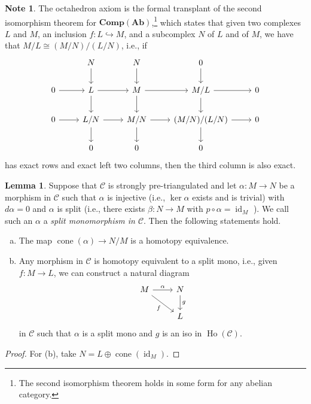 \documentclass[10pt,letterpaper,cm]{nupset}
\theoremstyle{definition}
\newtheorem{note}{Note}
\newtheorem{lemma}{Lemma}
\newcommand{\1}{\mathbf{1}}
\renewcommand{\c}{\mathscr{C}}
\newcommand{\0}{\vec 0}
\DeclareMathOperator{\id}{id}
\DeclareMathOperator{\cone}{cone}
\DeclareMathOperator{\ho}{Ho}
\begin{document}
\begin{note}
The octahedron axiom is the formal transplant of the second isomorphism theorem for $\mathbf{Comp}(\mathbf{Ab})$,\footnote{The second isomorphism theorem holds in some form for any abelian category.} which states that given two complexes $L$ and $M$, an inclusion $f : L \hookrightarrow M$, and a subcomplex $N$ of $L$ and of $M$, we have that $ M/L \cong (M/N)/(L/N)$, i.e., if
\[
\begin{tikzcd}
            & N \arrow[d]   & N \arrow[d]   & 0 \arrow[d]                     &   \\
0 \arrow[r] & L \arrow[d] \arrow[r]   & M \arrow[d] \arrow[r]   & M/L \arrow[d] \arrow[r]         & 0 \\
0 \arrow[r] & L/N \arrow[d] \arrow[r] & M/N \arrow[d] \arrow[r] & (M/N)/(L/N) \arrow[d] \arrow[r] & 0 \\
            & 0                       & 0                       & 0                               &  
\end{tikzcd}
\]
has exact rows and exact left two columns, then the third column is also exact. 
\end{note}

\begin{lemma}
Suppose that $\c$ is strongly pre-triangulated and let $\alpha : M \to N$ be a morphism in $\c$ such that $\alpha$ is injective (i.e., $\ker{\alpha}$ exists and is trivial) with $d{\alpha} =0$ and $\alpha$ is split (i.e.,  there exists $\beta : N \to M$ with $p \circ \alpha = \id_M$ ). We call such an $\alpha$ a \textit{split monomorphism in $\c$}. Then the following statements hold.
\begin{enumerate}[(a)]
\item The map $\cone(\alpha) \to N/M$ is a homotopy equivalence.
\item Any morphism in $\c$ is homotopy equivalent to a split mono, i.e., given $ f: M \to L$, we can construct a natural diagram 
\[
\begin{tikzcd}
M \arrow[r, "\alpha"] \arrow[rd, "f"'] & N \arrow[d, "g"] \\
                                       & L               
\end{tikzcd}
\]
in $\c$ such that $\alpha$ is a split mono and $g$ is an iso in $\ho(\c)$.
\end{enumerate}
\end{lemma}
\begin{proof}
For (b), take $N = L \oplus \cone(\id_M)$.
\end{proof}
\end{document}
